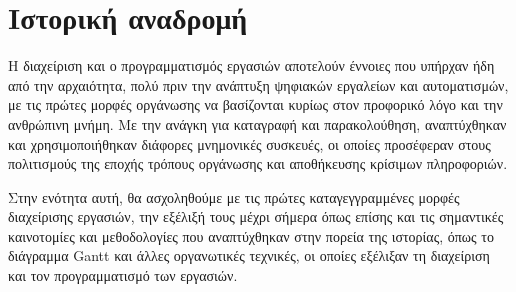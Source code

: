 
    \section{Ιστορική αναδρομή}
        Η διαχείριση και ο προγραμματισμός εργασιών αποτελούν έννοιες που υπήρχαν ήδη από την αρχαιότητα, πολύ πριν την ανάπτυξη ψηφιακών εργαλείων και αυτοματισμών, με τις πρώτες μορφές οργάνωσης να βασίζονται κυρίως στον προφορικό λόγο και την ανθρώπινη μνήμη. Με την ανάγκη για καταγραφή και παρακολούθηση, αναπτύχθηκαν και χρησιμοποιήθηκαν διάφορες μνημονικές συσκευές, οι οποίες προσέφεραν στους πολιτισμούς της εποχής τρόπους οργάνωσης και αποθήκευσης κρίσιμων πληροφοριών.

        Στην ενότητα αυτή, θα ασχοληθούμε με τις πρώτες καταγεγγραμμένες μορφές διαχείρισης εργασιών, την εξέλιξή τους μέχρι σήμερα όπως επίσης και τις σημαντικές καινοτομίες και μεθοδολογίες που αναπτύχθηκαν στην πορεία της ιστορίας, όπως το διάγραμμα Gantt και άλλες οργανωτικές τεχνικές, οι οποίες εξέλιξαν τη διαχείριση και τον προγραμματισμό των εργασιών.



